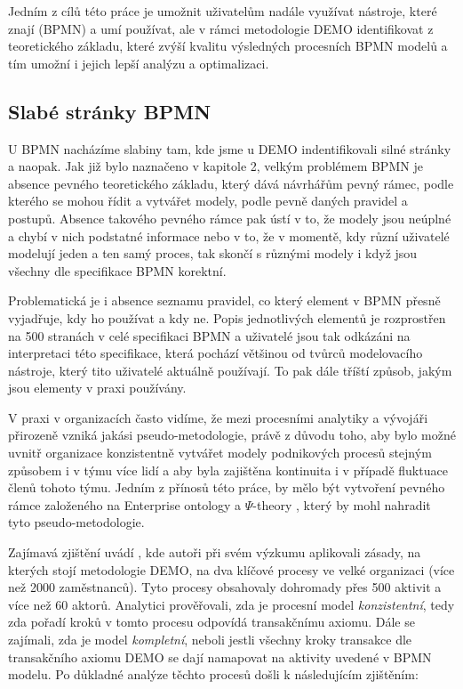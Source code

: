 \documentclass[]{article}
\newcommand{\ptheory}{$\Psi$-theory }
\begin{document}
Jedním z cílů této práce je umožnit uživatelům nadále využívat nástroje, které znají (BPMN) a umí používat, ale v rámci metodologie DEMO identifikovat  z teoretického základu, které zvýší kvalitu výsledných procesních BPMN modelů a tím umožní i jejich lepší analýzu a optimalizaci.

\subsection{Slabé stránky BPMN}
U BPMN nacházíme slabiny tam, kde jsme u DEMO indentifikovali silné stránky a naopak. Jak již bylo naznačeno v kapitole 2, velkým problémem BPMN je absence pevného teoretického základu, který dává návrhářům pevný rámec, podle kterého se mohou řídit a vytvářet modely, podle pevně daných pravidel a postupů. Absence takového pevného rámce pak ústí v to, že modely jsou neúplné a chybí v nich podstatné informace nebo v to, že v momentě, kdy různí uživatelé modelují jeden a ten samý proces, tak skončí s různými modely i když jsou všechny dle specifikace BPMN korektní.

Problematická je i absence seznamu pravidel, co který element v BPMN přesně vyjadřuje, kdy ho používat a kdy ne. Popis jednotlivých elementů je rozprostřen na 500 stranách v celé specifikaci BPMN \cite{Silver2011} a uživatelé jsou tak odkázáni na interpretaci této specifikace, která pochází většinou od tvůrců modelovacího nástroje, který tito uživatelé aktuálně používají. To pak dále tříští způsob, jakým jsou elementy v praxi používány.

V praxi v organizacích často vidíme, že mezi procesními analytiky a vývojáři přirozeně vzniká jakási pseudo-metodologie, právě z důvodu toho, aby bylo možné uvnitř organizace konzistentně vytvářet modely podnikových procesů stejným způsobem i v týmu více lidí a aby byla zajištěna kontinuita i v případě fluktuace členů tohoto týmu. Jedním z přínosů této práce, by mělo být vytvoření pevného rámce založeného na Enterprise ontology a \ptheory, který by mohl nahradit tyto pseudo-metodologie.

Zajímavá zjištění uvádí \cite{Caetano2012}, kde autoři při svém výzkumu aplikovali zásady, na kterých stojí metodologie DEMO, na dva klíčové procesy ve velké organizaci (více než 2000 zaměstnanců). Tyto procesy obsahovaly dohromady přes 500 aktivit a více než 60 aktorů. Analytici prověřovali, zda je procesní model \textit{konzistentní}, tedy zda pořadí kroků v tomto procesu odpovídá transakčnímu axiomu. Dále se zajímali, zda je model \textit{kompletní}, neboli jestli všechny kroky transakce dle transakčního axiomu DEMO se dají namapovat na aktivity uvedené v BPMN modelu. Po důkladné analýze těchto procesů došli k následujícím zjištěním:
\end{document}
